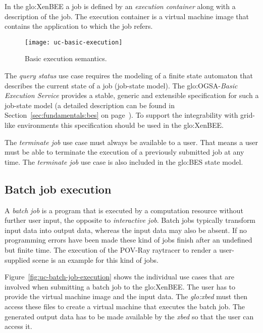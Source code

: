 In the \gls{glo:XenBEE} a job  is defined by an \emph{execution container}
along with a description of the  job. The execution container is a virtual
machine image that  contains the application to which  the job refers.

\begin{figure}[ht]
  \centering
  \texttt{[image: uc-basic-execution]}
  \caption{Basic execution semantics.}
  \label{fig:uc-basic-execution}
\end{figure}

The \emph{query status}  use case requires the modeling  of a finite state
automaton that describes the current state of a job (job-state model). The
\gls{glo:OGSA}-\emph{Basic  Execution Service} \cite{ogsa-bes}  provides a
stable, generic and extensible specification for such a job-state model (a
detailed description can be found in Section~\ref{sec:fundamentals:bes} on
page~\pageref{sec:fundamentals:bes}).   To support the  integrability with
grid-like  environments   this  specification   should  be  used   in  the
\gls{glo:XenBEE}.

The  \emph{terminate  job}  use  case  must  always  be  available  to  a
user. That  means a  user must be  able to  terminate the execution  of a
previously submitted job  at any time.  The \emph{terminate  job} use case
is also included in the \gls{glo:BES} state model.

\subsection{Batch job execution}
\label{sec:req:batch-job-execution}

A \emph{batch job} is a program that is executed by a computation resource
without further  user input, \ie  the opposite to  \emph{interactive job}.
Batch jobs  typically transform input  data into output data,  whereas the
input data  may also be  absent. If no  programming errors have  been made
these  kind  of jobs  finish  after an  undefined  but  finite time.   The
execution   of  the   POV-Ray   raytracer  \cite{POV-Ray}   to  render   a
user-supplied scene is an example for this kind of jobs.

Figure~\ref{fig:uc-batch-job-execution}  shows  the  individual use  cases
that are involved when submitting a batch job to the \gls{glo:XenBEE}. The
user has  to provide  the virtual  machine image and  the input  data. The
\emph{\gls{glo:xbed}}  must then access  these files  to create  a virtual
machine that executes  the batch job. The generated output  data has to be
made available by the \emph{xbed} so that the user can access it.

